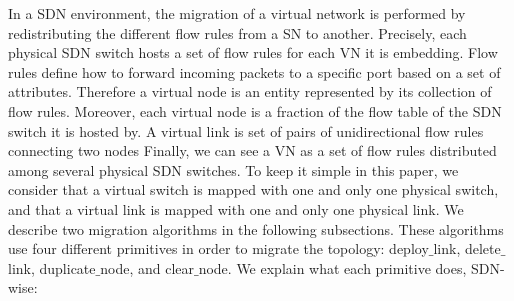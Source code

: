 \label{sec:migration}
In a SDN environment, the migration of a virtual network is performed by redistributing the different flow rules from a SN to another.
Precisely, each physical SDN switch hosts a set of flow rules for each VN it is embedding.
Flow rules define how to forward incoming packets to a specific port based on a set of attributes.
Therefore a virtual node is an entity represented by its collection of flow rules.
Moreover, each virtual node is a fraction of the flow table of the SDN switch it is hosted by.
A virtual link is set of pairs of unidirectional flow rules connecting two nodes
Finally, we can see a VN as a set of flow rules distributed among several physical SDN switches.
To keep it simple in this paper, we consider that a virtual switch is mapped with one and only one physical switch, and that a virtual link is mapped with one and only one physical link.
We describe two migration algorithms in the following subsections.
These algorithms use four different primitives in order to migrate the topology: deploy$\_$link, delete$\_$link, duplicate$\_$node, and clear$\_$node. 
We explain what each primitive does, SDN-wise:

